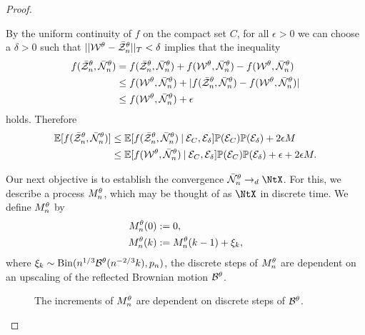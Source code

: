 \begin{proof}
\begin{proofpart}
By the uniform continuity of $f$ on the compact set $C$, for all $\epsilon>0$ we can choose a $\delta > 0$ such that $||\mathcal{W}^{\theta} - \bar{\mathcal{Z}}^{\theta}_n||_T < \delta$ implies
that the inequality
\begin{equation*}
\begin{aligned}
f(\bar{\mathcal{Z}}^{\theta}_n, \bar{\mathcal{N}}_n^{\theta}) &= f(\bar{\mathcal{Z}}^{\theta}_n, \bar{\mathcal{N}}_n^{\theta}) + f(\mathcal{W}^{\theta}, \bar{\mathcal{N}}_n^{\theta}) - f(\mathcal{W}^{\theta}, \bar{\mathcal{N}}_n^{\theta}) \\
&\leq f(\mathcal{W}^{\theta}, \bar{\mathcal{N}}_n^{\theta}) + |f(\bar{\mathcal{Z}}^{\theta}_n, \bar{\mathcal{N}}_n^{\theta}) - f(\mathcal{W}^{\theta}, \bar{\mathcal{N}}_n^{\theta})| \\
&\leq f(\mathcal{W}^{\theta}, \bar{\mathcal{N}}_n^{\theta}) + \epsilon
\end{aligned}
\end{equation*}
holds. Therefore
\begin{equation} \label{E: Estimation step 3}
\begin{aligned}
\mathbb{E}[f(\bar{\mathcal{Z}}^{\theta}_n, \bar{\mathcal{N}}_n^{\theta}) ] 
&\leq \mathbb{E}[f(\bar{\mathcal{Z}}^{\theta}_n, \bar{\mathcal{N}}_n^{\theta}) \: | \: \mathcal{E}_{C}, \mathcal{E}_{\delta}]\mathbb{P}(\mathcal{E}_{C})\mathbb{P}(\mathcal{E}_{\delta}) + 2 \epsilon M \\
&\leq \mathbb{E}[f(\mathcal{W}^{\theta}, \bar{\mathcal{N}}_n^{\theta}) \: | \: \mathcal{E}_{C}, \mathcal{E}_{\delta}]\mathbb{P}(\mathcal{E}_{C})\mathbb{P}(\mathcal{E}_{\delta}) + \epsilon + 2 \epsilon M.
\end{aligned}
\end{equation}
\end{proofpart}




\begin{proofpart}
Our next objective is to establish the convergence $\rnntX \rightarrow_d \NtX$.
For this, we describe a process $M_n^{\theta}$, which may be thought of as $\NtX$ in discrete time.
We define $M_n^{\theta}$ by
\begin{equation}
\begin{aligned}
M_n^{\theta}(0) &:= 0, \\
M_n^{\theta}(k) &:= M_n^{\theta}(k-1) + \xi_k, 
\end{aligned}
\end{equation}
where $\xi_k \sim \operatorname*{Bin}(n^{1 / 3}\mathcal{B}^{\theta}(n^{-2 / 3}k), p_n)$,
the discrete steps of $M_n^{\theta}$ are dependent on an upscaling of the reflected Brownian motion $\mathcal{B}^{\theta}$.

\begin{figure}[ht]
	\centering
	
	\caption{The increments of $M_n^{\theta}$ are dependent on discrete steps of $\mathcal{B}^{\theta}$.} 
	\label{F: Mn}
\end{figure}


\end{proofpart}
\end{proof}
